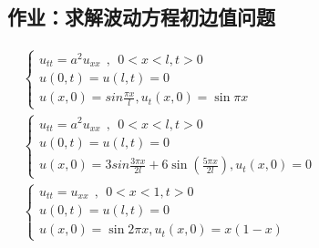 \subsection{作业：求解波动方程初边值问题}
	$\begin{array}{lllllllll}

	& \begin{cases}
		u_{tt} =a^2u_{xx} ~~,~~ 0<x<l, t>0\\
		u(0,t) =u(l,t)=0 \\
		u(x,0) =sin \frac{\pi x}{l} ,  u_t (x,0)=\sin \pi x 
	    \end{cases}\\	
	&\begin{cases}
		u_{tt} =a^2u_{xx} ~~,~~ 0<x<l, t>0\\
		u(0,t) =u(l,t)=0 \\
		u(x,0) =3sin \frac{3\pi x}{2l} +6\sin(\frac{5\pi x}{2l}),  u_t (x,0)=0
	\end{cases} \\	
	&\begin{cases}
		u_{tt} =u_{xx} ~~,~~ 0<x<1, t>0\\
		u(0,t) =u(l,t)=0  \\
		u(x,0) =\sin 2\pi x ,  u_t (x,0)=x (1-x) 
	\end{cases} \\	
\end{array}$ \\ 


